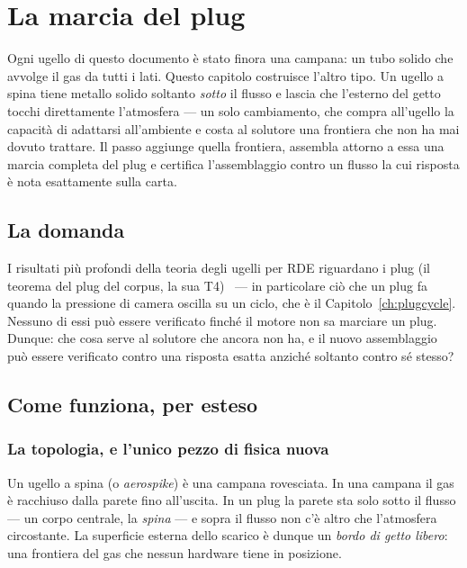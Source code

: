 \chapter{La marcia del plug}
\label{ch:plug}

Ogni ugello di questo documento è stato finora una campana: un tubo
solido che avvolge il gas da tutti i lati. Questo capitolo costruisce
l'altro tipo. Un ugello a spina tiene metallo solido soltanto
\emph{sotto} il flusso e lascia che l'esterno del getto tocchi
direttamente l'atmosfera --- un solo cambiamento, che compra
all'ugello la capacità di adattarsi all'ambiente e costa al solutore
una frontiera che non ha mai dovuto trattare. Il passo aggiunge
quella frontiera, assembla attorno a essa una marcia completa del
plug e certifica l'assemblaggio contro un flusso la cui risposta è
nota esattamente sulla carta.

\section{La domanda}

I risultati più profondi della teoria degli ugelli per RDE
riguardano i plug (il teorema del plug del corpus, la sua
T4)~\cite{theory} --- in particolare ciò che un plug fa quando la
pressione di camera oscilla su un ciclo, che è il
Capitolo~\ref{ch:plugcycle}. Nessuno di essi può essere verificato
finché il motore non sa marciare un plug. Dunque: che cosa serve al
solutore che ancora non ha, e il nuovo assemblaggio può essere
verificato contro una risposta esatta anziché soltanto contro sé
stesso?

\section{Come funziona, per esteso}

\subsection{La topologia, e l'unico pezzo di fisica nuova}

Un ugello a spina (o \emph{aerospike}) è una campana rovesciata. In
una campana il gas è racchiuso dalla parete fino all'uscita. In un
plug la parete sta solo sotto il flusso --- un corpo centrale, la
\emph{spina} --- e sopra il flusso non c'è altro che l'atmosfera
circostante. La superficie esterna dello scarico è dunque un
\emph{bordo di getto libero}: una frontiera del gas che nessun
hardware tiene in posizione.

